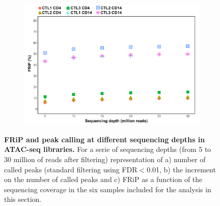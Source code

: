\begin{figure}[htbp]
\begin{subfigure}{0.45\textwidth}
\includegraphics[width=\textwidth]{./Results1/pdfs/ATAC_Core_fresh_CD4_CD14_frac_reads_in_peaks_vs_depth}
\caption{\textbf{}}
\end{subfigure}
\caption[FRiP and peak calling at different sequencing depths in ATAC-seq libraries.]{\textbf{FRiP and peak calling at different sequencing depths in ATAC-seq libraries.} For a serie of sequencing depths (from 5 to 30 million of reads after filtering) representation of a) number of called peaks (standard filtering using FDR$<$0.01, b) the increment on the number of called peaks and c)  FRiP as a function of the sequencing coverage in the six samples included for the analysis in this section.}
\label{fig:Peak_calling_versus_depth_ATAC}
\end{figure} 



